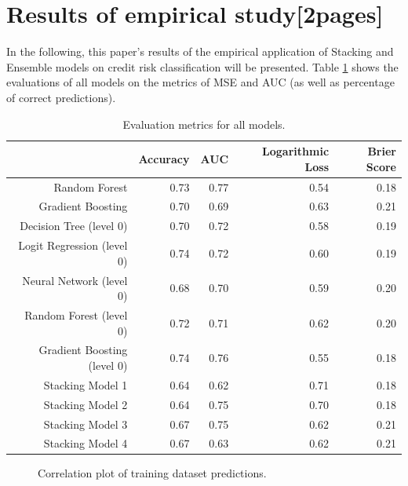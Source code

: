 \documentclass[12pt]{article}
\begin{document}
\section{Results of empirical study[2pages]}\label{results}
In the following, this paper's results of the empirical application of Stacking and Ensemble models on credit risk classification will be presented. Table \ref{eval} shows the evaluations of all models on the metrics of MSE and AUC (as well as percentage of correct predictions).

\begin{table}[ht]
\centering
\begin{tabular}{rrrrr}
  \hline
 & Accuracy & AUC & Logarithmic Loss & Brier Score \\ 
  \hline
Random Forest & 0.73 & 0.77 & 0.54 & 0.18 \\ 
  Gradient Boosting & 0.70 & 0.69 & 0.63 & 0.21 \\ 
  \hline
  Decision Tree (level 0) & 0.70 & 0.72 & 0.58 & 0.19 \\ 
  Logit Regression (level 0) & 0.74 & 0.72 & 0.60 & 0.19 \\ 
  Neural Network (level 0) & 0.68 & 0.70 & 0.59 & 0.20 \\ 
  Random Forest (level 0) & 0.72 & 0.71 & 0.62 & 0.20 \\ 
  Gradient Boosting (level 0) & 0.74 & 0.76 & 0.55 & 0.18 \\
  \hline 
  Stacking Model 1 & 0.64 & 0.62 & 0.71 & 0.18 \\ 
  Stacking Model 2 & 0.64 & 0.75 & 0.70 & 0.18 \\ 
  Stacking Model 3 & 0.67 & 0.75 & 0.62 & 0.21 \\ 
  Stacking Model 4 & 0.67 & 0.63 & 0.62 & 0.21 \\ 
   \hline
\end{tabular}
\caption{Evaluation metrics for all models.}\label{eval}
\end{table}

\begin{figure}[htp] 
\caption{Correlation plot of training dataset predictions.}\label{corrgram}
\end{figure}  
\end{document}
